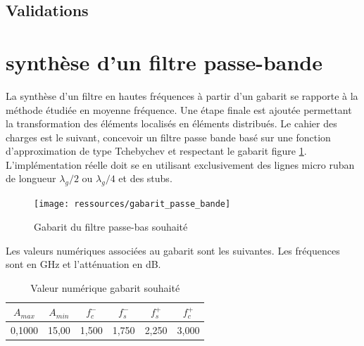 \documentclass[french]{article}
\begin{document}
\subsection*{Validations}

\newpage

\section{synthèse d'un filtre passe-bande}

La synthèse d'un filtre en hautes fréquences à partir d'un gabarit se rapporte à la méthode étudiée en moyenne fréquence. Une étape finale est ajoutée permettant la transformation des éléments localisés en éléments distribués.
Le cahier des charges est le suivant, concevoir un filtre passe bande basé sur une fonction d'approximation de type Tchebychev et respectant le gabarit figure \ref{fig:gab}. L'implémentation réelle doit se en utilisant exclusivement des lignes micro ruban de longueur $\lambda_g/2$ ou $\lambda_g/4$ et des stubs.

\begin{figure}[H]
	\centering
	\texttt{[image: ressources/gabarit\_passe\_bande]}
	\caption{Gabarit du filtre passe-bas souhaité}
	\label{fig:gab}
\end{figure}
Les valeurs numériques associées au gabarit sont les suivantes. Les fréquences sont en GHz et l'atténuation en dB. 
	\begin{table}[H]
		\centering
\begin{tabular}{|c|c|c|c|c|c|}
		\hline
	$A_{max}$& $A_{min}$ & $f_c^-$ & $f_s^-$ & $f_s^+$ &$f_c^+$ \\ \hline
	0,1000	 & 15,00 		& 1,500	   & 1,750 & 2,250& 3,000 \\ \hline
	\end{tabular}
\caption{Valeur numérique gabarit souhaité}
	\end{table}
\end{document}
